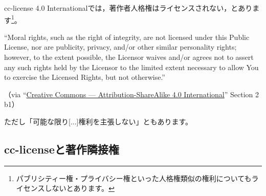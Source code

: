 \documentclass{ltjsarticle}
\begin{document}
cc-license 4.0 Internationalでは，著作者人格権はライセンスされない，とあります\footnote{パブリシティー権・プライバシー権といった人格権類似の権利についてもライセンスしないとあります。}。
\begin{mdframed}
 ``Moral rights, such as the right of integrity, are not licensed under this Public License, nor are publicity, privacy, and/or other similar personality rights; however, to the extent possible, the Licensor waives and/or agrees not to assert any such rights held by the Licensor to the limited extent necessary to allow You to exercise the Licensed Rights, but not otherwise.'' \par
（via  ``\href{http://creativecommons.org/licenses/by-sa/4.0/legalcode}{Creative Commons — Attribution-ShareAlike 4.0 International}''  Section 2 b1）
\end{mdframed}
ただし「可能な限り[...]権利を主張しない」ともあります。


\subsection{cc-licenseと著作隣接権} \label{sec:similar-rights}
\end{document}
